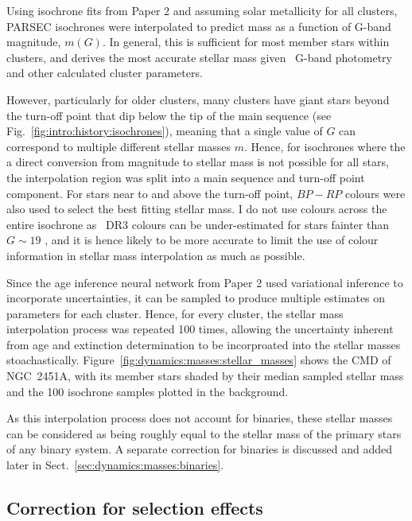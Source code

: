 Using isochrone fits from Paper 2 and assuming solar metallicity for all clusters, PARSEC isochrones \citep{bressan_parsec_2012} were interpolated to predict mass as a function of G-band magnitude, $m(G)$. In general, this is sufficient for most member stars within clusters, and derives the most accurate stellar mass given \gaia\ G-band photometry and other calculated cluster parameters. 
 
However, particularly for older clusters, many clusters have giant stars beyond the turn-off point that dip below the tip of the main sequence (see Fig.~\ref{fig:intro:history:isochrones}), meaning that a single value of $G$ can correspond to multiple different stellar masses $m$. Hence, for isochrones where the a direct conversion from magnitude to stellar mass is not possible for all stars, the interpolation region was split into a main sequence and turn-off point component. For stars near to and above the turn-off point, $BP-RP$ colours were also used to select the best fitting stellar mass. I do not use colours across the entire isochrone as \gaia\ DR3 colours can be under-estimated for stars fainter than $G\sim19$ \citep[especially in the BP band,][]{riello_gaia_2021}, and it is hence likely to be more accurate to limit the use of colour information in stellar mass interpolation as much as possible.

Since the age inference neural network from Paper 2 used variational inference to incorporate uncertainties, it can be sampled to produce multiple estimates on parameters for each cluster. Hence, for every cluster, the stellar mass interpolation process was repeated 100 times, allowing the uncertainty inherent from age and extinction determination to be incorproated into the stellar masses stoachastically. Figure~\ref{fig:dynamics:masses:stellar_masses} shows the CMD of NGC~2451A, with its member stars shaded by their median sampled stellar mass and the 100 isochrone samples plotted in the background.

As this interpolation process does not account for binaries, these stellar masses can be considered as being roughly equal to the stellar mass of the primary stars of any binary system. A separate correction for binaries is discussed and added later in Sect.~\ref{sec:dynamics:masses:binaries}.


\subsection{Correction for selection effects}
\label{sec:dynamics:masses:selection}

